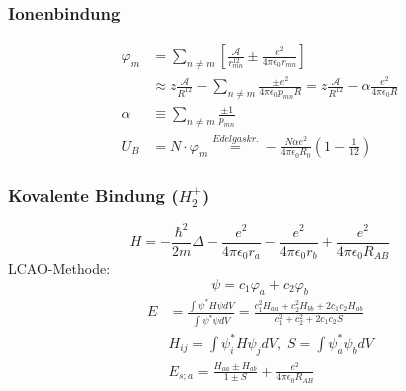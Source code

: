 \subsubsection*{Ionenbindung}
\begin{equation*}
    \begin{aligned}
        \varphi_m &= \sum_{n \neq m} \left[\frac{\mathcal{A}}{r_{mn}^{12}} \pm \frac{e^2}{4 \pi \epsilon_0 r_{mn}}\right] \\
            &\approx z \frac{\mathcal{A}}{R^{12}} - \sum_{n \neq m} \frac{\pm e^2}{4 \pi \epsilon_0 p_{mn}R} = z  \frac{\mathcal{A}}{R^{12}} - \alpha \frac{e^2}{4 \pi \epsilon_0 R} \\
        \alpha & \equiv \sum_{n \neq m} \frac{\pm 1}{p_{mn}} \\
        U_B &= N \cdot \varphi_m \overset{Edelgaskr.}{=} - \frac{N \alpha e^2}{4 \pi \epsilon_0 R_0} \left(1- \frac{1}{12}\right)
    \end{aligned}
\end{equation*}

\subsubsection*{Kovalente Bindung ($H_2^+$)}
\begin{equation*}
    H = -\frac{\hbar^2}{2m} \Delta - \frac{e^2}{4 \pi \epsilon_0 r_a} - \frac{e^2}{4 \pi \epsilon_0 r_b} +\frac{e^2}{4 \pi \epsilon_0 R_{AB}}
\end{equation*}
LCAO-Methode:
\begin{equation*}
    \psi = c_1\varphi_a + c_2 \varphi_b
\end{equation*}
\begin{equation*}
    \begin{aligned}
        E &= \frac{\int \psi^* H \psi dV}{\int \psi^* \psi dV} = \frac{c_1^2H_{aa}+c_2^2H_{bb}+2c_1c_2H_{ab}}{c_1^2+c_2^2+2c_1c_2S} \\
        &H_{ij} = \int \psi_i^* H \psi_j dV , \; S= \int \psi_a^* \psi_b dV \\
        &E_{s;a} = \frac{H_{aa} \pm H_{ab}}{1 \pm S} + \frac{e^2}{4 \pi \epsilon_0 R_{AB}}
    \end{aligned}
\end{equation*}

